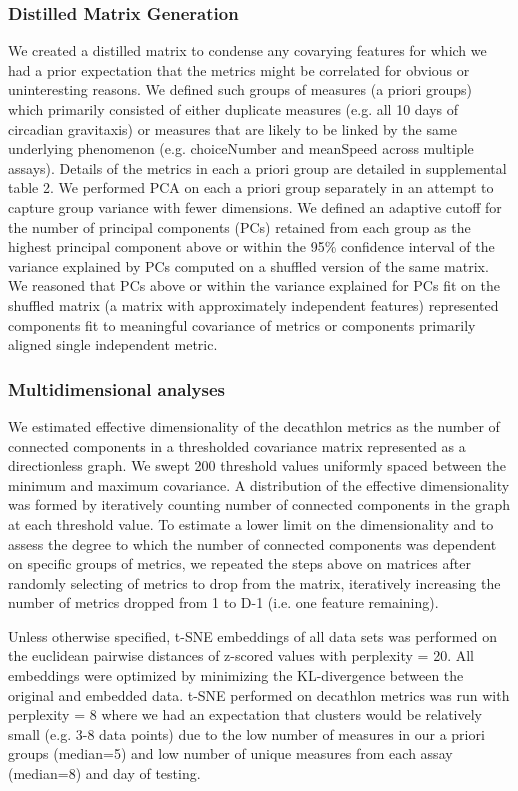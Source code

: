 \documentclass[12pt,letterpaper]{article}
\begin{document}
\subsubsection{Distilled Matrix Generation}

We created a distilled matrix to condense any covarying features for which we had a prior expectation that the metrics might be correlated for obvious or uninteresting reasons. We defined such groups of measures (a priori groups) which primarily consisted of either duplicate measures (e.g. all 10 days of circadian gravitaxis) or measures that are likely to be linked by the same underlying phenomenon (e.g. choiceNumber and meanSpeed across multiple assays). Details of the metrics in each a priori group are detailed in supplemental table 2. We performed PCA on each a priori group separately in an attempt to capture group variance with fewer dimensions. We  defined an adaptive cutoff for the number of principal components (PCs) retained from each group as the highest principal component above or within the 95\% confidence interval of the variance explained by PCs computed on a shuffled version of the same matrix. We reasoned that PCs above or within the variance explained for PCs fit on the shuffled matrix (a matrix with approximately independent features) represented components fit to meaningful covariance of metrics or components primarily aligned single independent metric.

\subsubsection{Multidimensional analyses}

We estimated effective dimensionality of the decathlon metrics as the number of connected components in a thresholded covariance matrix represented as a directionless graph. We swept 200 threshold values uniformly spaced between the minimum and maximum covariance. A distribution of the effective dimensionality was formed by iteratively counting number of connected components in the graph at each threshold value. To estimate a lower limit on the dimensionality and to assess the degree to which the number of connected components was dependent on specific groups of metrics, we repeated the steps above on matrices after randomly selecting of metrics to drop from the matrix, iteratively increasing the number of metrics dropped from 1 to D-1 (i.e. one feature remaining).

Unless otherwise specified, t-SNE embeddings of all data sets was performed on the euclidean pairwise distances of z-scored values with perplexity = 20. All embeddings were optimized by minimizing the KL-divergence between the original and embedded data. t-SNE performed on decathlon metrics was run with perplexity = 8 where we had an expectation that clusters would be relatively small (e.g. 3-8 data points) due to the low number of measures in our a priori groups (median=5) and low number of unique measures from each assay (median=8) and day of testing.
\end{document}
